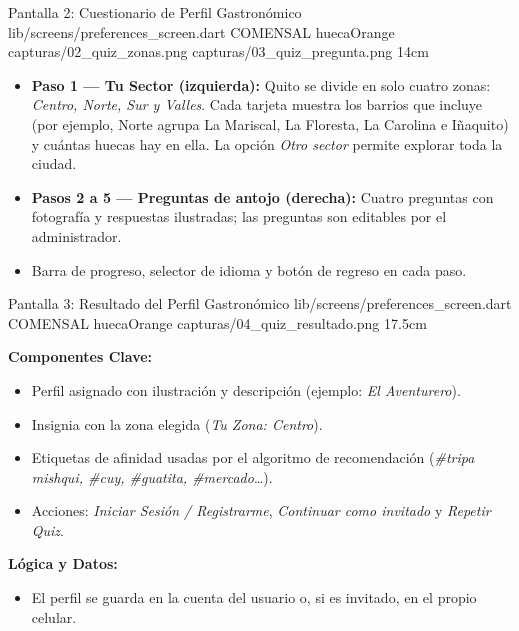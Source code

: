 \pantalladoble
  {Pantalla 2: Cuestionario de Perfil Gastronómico}
  {lib/screens/preferences_screen.dart}
  {COMENSAL}
  {huecaOrange}
  {capturas/02_quiz_zonas.png}
  {capturas/03_quiz_pregunta.png}
  {14cm}
  {
    \begin{itemize}[leftmargin=*, itemsep=2pt]
      \item \textbf{Paso 1 --- Tu Sector (izquierda):} Quito se divide en solo cuatro zonas: \textit{Centro, Norte, Sur y Valles}. Cada tarjeta muestra los barrios que incluye (por ejemplo, Norte agrupa La Mariscal, La Floresta, La Carolina e Iñaquito) y cuántas huecas hay en ella. La opción \textit{Otro sector} permite explorar toda la ciudad.
      \item \textbf{Pasos 2 a 5 --- Preguntas de antojo (derecha):} Cuatro preguntas con fotografía y respuestas ilustradas; las preguntas son editables por el administrador.
      \item Barra de progreso, selector de idioma y botón de regreso en cada paso.
    \end{itemize}
  }

\pantallashowcase
  {Pantalla 3: Resultado del Perfil Gastronómico}
  {lib/screens/preferences_screen.dart}
  {COMENSAL}
  {huecaOrange}
  {capturas/04_quiz_resultado.png}
  {17.5cm}
  {

    \textbf{Componentes Clave:}
    \begin{itemize}[leftmargin=*, itemsep=2pt]
      \item Perfil asignado con ilustración y descripción (ejemplo: \textit{El Aventurero}).
      \item Insignia con la zona elegida (\textit{Tu Zona: Centro}).
      \item Etiquetas de afinidad usadas por el algoritmo de recomendación (\textit{\#tripa mishqui, \#cuy, \#guatita, \#mercado}\dots).
      \item Acciones: \textit{Iniciar Sesión / Registrarme}, \textit{Continuar como invitado} y \textit{Repetir Quiz}.
    \end{itemize}
    \vspace{0.2cm}

    \textbf{Lógica y Datos:}
    \begin{itemize}[leftmargin=*, itemsep=2pt]
      \item El perfil se guarda en la cuenta del usuario o, si es invitado, en el propio celular.
    \end{itemize}
  }

